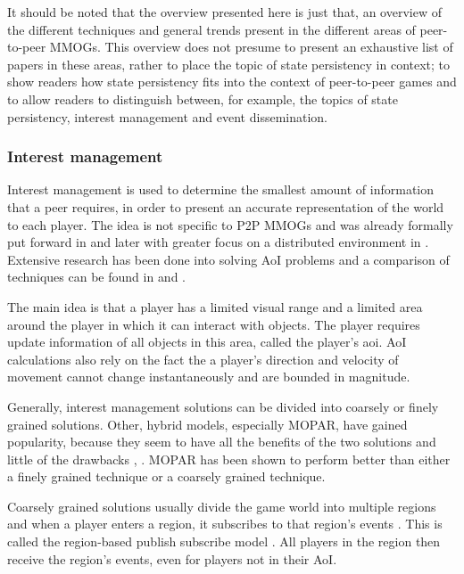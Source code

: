 \documentclass[10pt,a4paper,journal,cspaper,compsoc]{IEEEtran}
\begin{document}
It should be noted that the overview presented here is just that, an overview of the different techniques and general trends present in the different
areas of peer-to-peer MMOGs. This overview does not presume to present an exhaustive list of papers in these areas, rather to place the topic of
state persistency in context; to show readers how state persistency fits into the context of peer-to-peer games and to allow readers to distinguish
between, for example, the topics of state persistency, interest management and event dissemination.

\subsubsection{Interest management}
\label{key_challenges_im}

Interest management is used to determine the smallest amount of information that a peer requires, in order to present an accurate representation of
the world to each player. The idea is not specific to P2P MMOGs and was already formally put forward in \cite{First_IM} and later with greater focus
on a distributed environment in \cite{Whang_agent_based_IM}. Extensive research has been done into solving AoI problems and a comparison of
techniques can be found in \cite{Boulanger_IM_compare} and \cite{IM_and_ED_survey_Krause}.

The main idea is that a player has a limited visual range and a limited area around the player in which it can interact with objects. The player
requires update information of all objects in this area, called the player's \ac{aoi}. AoI calculations also rely on the fact the a player's
direction and velocity of movement cannot change instantaneously and are bounded in magnitude.

Generally, interest management solutions can be divided into coarsely or finely grained solutions. Other, hybrid models, especially MOPAR, have
gained popularity, because they seem to have all the benefits of the two solutions and little of the drawbacks \cite{hybrid_IM}, \cite{MOPAR}. MOPAR
has been shown to perform better than either a finely grained technique or a coarsely grained technique.

Coarsely grained solutions usually divide the game world into multiple regions and when a player enters a region, it subscribes to that region's
events \cite{mercury_publish_subscribe}. This is called the region-based publish subscribe model \cite{Fan_deisgn_issues_p2p}. All players in the
region then receive the region's events, even for players not in their AoI.
\end{document}
